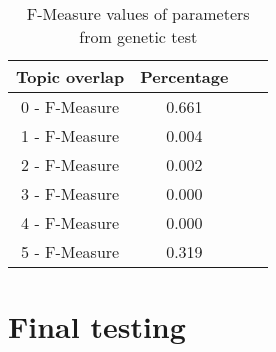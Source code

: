 \begin{table}
\begin{center}
\begin{tabular}{|c|c|c|c|}
\hline
Topic overlap & Percentage\\ 
\hline
0 - F-Measure & 0.661\\
1 - F-Measure & 0.004\\
2 - F-Measure & 0.002\\
3 - F-Measure & 0.000\\
4 - F-Measure & 0.000\\
5 - F-Measure & 0.319\\
\hline
\end{tabular}
\end{center}
\caption{F-Measure values of parameters from genetic test}
\label{tab:geneticparametersfmeasure}
\end{table}

\section{Final testing}




